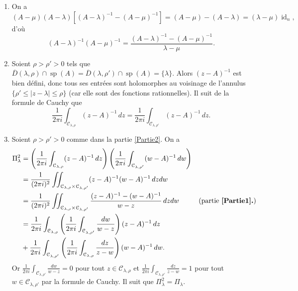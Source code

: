 \documentclass[french, 12pt]{article}
\theoremstyle{definition}
\newcommand{\tuple}[1]{\left(#1\right)}
\newcommand{\ol}[1]{\overline{#1}}
\newcommand{\Ccal}{\mathcal{C}}
\newcommand{\id}{\operatorname{id}}
\newcommand{\spec}{\operatorname{sp}}
\newcommand{\ds}{\displaystyle}
\begin{document}
\begin{enumerate}
    \item \label{Partie1} On a
        $$(A - \mu)(A - \lambda)[(A - \lambda)^{-1} - (A - \mu)^{-1}] = (A - \mu) - (A - \lambda) = (\lambda - \mu)\id_n,$$
    d'o\`u 
        \begin{equation} \label{eq1}
            (A - \lambda)^{-1}(A - \mu)^{-1} = \frac{(A - \lambda)^{-1} - (A - \mu)^{-1}}{\lambda - \mu}.
        \end{equation}
        
    \item \label{Partie2} Soient $\rho > \rho' > 0$ tels que $\ol{D}(\lambda,\rho) \cap \spec(A) = \ol{D}(\lambda,\rho') \cap \spec(A) = \{\lambda\}$. Alors $(z-A)^{-1}$ est bien d\'efini, donc tous ses entr\'ees sont holomorphes au voisinage de l'annulus $\{\rho' \le |z - \lambda| \le \rho\}$ (car elle sont des fonctions rationnelles). Il suit de la formule de Cauchy que
        \begin{equation*}
            \frac{1}{2\pi i} \int_{\Ccal_{\lambda,\rho}} (z - A)^{-1}\,dz = \frac{1}{2\pi i} \int_{\Ccal_{\lambda,\rho'}} (z - A)^{-1}\,dz.
        \end{equation*}
    
    \item \label{Partie3} Soient $\rho > \rho' > 0$ comme dans la partie \ref{Partie2}. On a
        \begin{align*}
            \Pi_\lambda^2 & = \tuple{\frac{1}{2\pi i} \int_{\Ccal_{\lambda,\rho}} (z - A)^{-1}\,dz}\tuple{\frac{1}{2\pi i} \int_{\Ccal_{\lambda,\rho'}} (w - A)^{-1}\,dw} \\
            & = \frac{1}{(2\pi i)^2} \iint_{\Ccal_{\lambda,\rho} \times \Ccal_{\lambda,\rho'}} (z - A)^{-1}(w - A)^{-1} \,dzdw \\
            & = \frac{1}{(2\pi i)^2}\iint_{\Ccal_{\lambda,\rho} \times \Ccal_{\lambda,\rho'}} \frac{(z - A)^{-1} - (w - A)^{-1}}{w - z}\,dzdw & \text{(partie {\bf\ref{Partie1}.})}\\
            & = \frac{1}{2\pi i}\int_{\Ccal_{\lambda,\rho}} \tuple{\frac{1}{2\pi i}\int_{\Ccal_{\lambda,\rho'}}\frac{dw}{w - z}} (z-A)^{-1}\,dz \\
            & + \frac{1}{2\pi i}\int_{\Ccal_{\lambda,\rho'}} \tuple{\frac{1}{2\pi i}\int_{\Ccal_{\lambda,\rho}}\frac{dz}{z - w}} (w-A)^{-1}\,dw.
        \end{align*}
    Or $\ds \frac{1}{2\pi i}\int_{\Ccal_{\lambda,\rho'}}\frac{dw}{w - z} = 0$ pour tout $z \in \Ccal_{\lambda,\rho}$ et $\ds \frac{1}{2\pi i}\int_{\Ccal_{\lambda,\rho'}}\frac{dz}{z - w} = 1$ pour tout $w \in \Ccal_{\lambda,\rho'}$ par la formule de Cauchy. Il suit que $\Pi_\lambda^2 = \Pi_\lambda$.
    

\end{enumerate}
\end{document}
